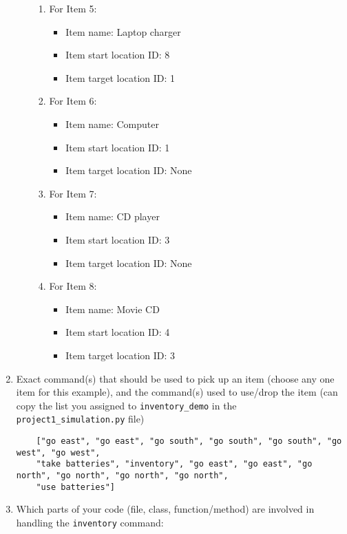 \documentclass[11pt]{article}
\begin{document}
\begin{enumerate}
\begin{enumerate}
\begin{enumerate}
        \item For Item 5:
        \begin{itemize}
            \item Item name: Laptop charger
            \item Item start location ID: 8
            \item Item target location ID: 1
        \end{itemize}

        \item For Item 6:
        \begin{itemize}
            \item Item name: Computer
            \item Item start location ID: 1
            \item Item target location ID: None
        \end{itemize}

        \item For Item 7:
        \begin{itemize}
            \item Item name: CD player
            \item Item start location ID: 3
            \item Item target location ID: None
        \end{itemize}

        \item For Item 8:
        \begin{itemize}
            \item Item name: Movie CD
            \item Item start location ID: 4
            \item Item target location ID: 3
        \end{itemize}
    \end{enumerate}
\end{enumerate}


    \item Exact command(s) that should be used to pick up an item (choose any one item for this example), and the
    command(s) used to use/drop the item (can copy the list you assigned to \texttt{inventory\_demo} in the
    \texttt{project1\_simulation.py} file)
    \begin{verbatim}
    ["go east", "go east", "go south", "go south", "go south", "go west", "go west",
    "take batteries", "inventory", "go east", "go east", "go north", "go north", "go north", "go north",
    "use batteries"]
    \end{verbatim}
    \item Which parts of your code (file, class, function/method) are involved in handling the \texttt{inventory}
    command:
\end{enumerate}
\end{document}
